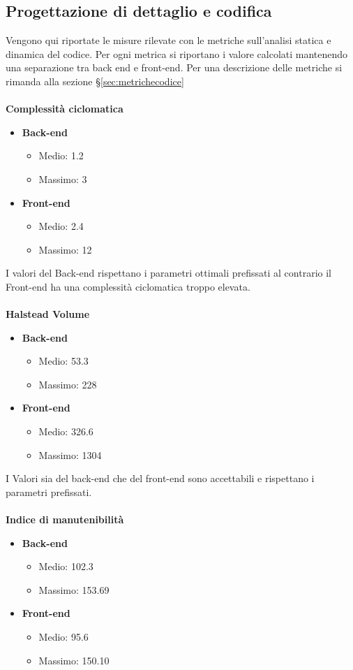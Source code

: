 \subsection{Progettazione di dettaglio e codifica}
Vengono qui riportate le misure rilevate con le metriche sull’analisi statica e dinamica del codice. Per ogni metrica si riportano i valore calcolati mantenendo una separazione tra back end e front-end. Per una descrizione delle metriche si rimanda alla sezione \S\ref{sec:metrichecodice}\\\\
\textbf{Complessità ciclomatica}
\begin{itemize}
\item \textbf{Back-end}
\begin{itemize}
\item Medio: 1.2
\item Massimo: 3
\end{itemize}
\item \textbf{Front-end}
\begin{itemize}
\item Medio: 2.4
\item Massimo: 12
\end{itemize}
\end{itemize}
I valori del Back-end rispettano i parametri ottimali prefissati al contrario il Front-end ha una complessità ciclomatica troppo elevata.
\\\\
\textbf{Halstead Volume}
\begin{itemize}
\item \textbf{Back-end}
\begin{itemize}
\item Medio: 53.3
\item Massimo: 228
\end{itemize}
\item \textbf{Front-end}
\begin{itemize}
\item Medio: 326.6
\item Massimo: 1304
\end{itemize}
\end{itemize}
I Valori sia del back-end che del front-end sono accettabili e rispettano i parametri prefissati.
\\\\
\textbf{Indice di manutenibilità}
\begin{itemize}
\item \textbf{Back-end}
\begin{itemize}
\item Medio: 102.3
\item Massimo: 153.69
\end{itemize}
\item \textbf{Front-end}
\begin{itemize}
\item Medio: 95.6
\item Massimo: 150.10
\end{itemize}
\end{itemize}
